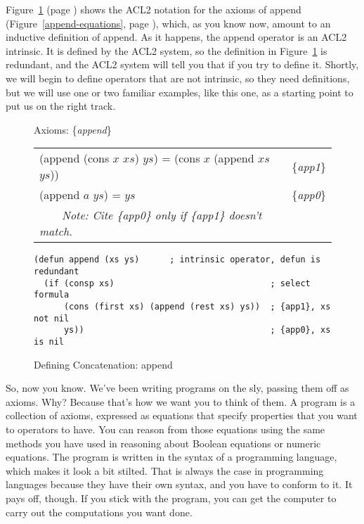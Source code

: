 Figure~\ref{fig:append-defun} (page \pageref{fig:append-defun})
shows the ACL2 notation for the axioms of append
(Figure~\ref{append-equations}, page \pageref{append-equations}),
which, as you know now, amount to an inductive definition of append.
As it happens, the append operator is an ACL2 intrinsic.
It is defined by the ACL2 system, so the definition
in Figure~\ref{fig:append-defun} is redundant,
and the ACL2 system will tell you that if you try to define it.
Shortly, we will begin to define operators that are not
intrinsic, so they need definitions,
but we will use one or two familiar examples, like this one,
as a starting point to put us on the right track.

\begin{figure}
\begin{center}
Axioms: \{\emph{append}\} \\
\begin{tabular}{ll}
(append (cons $x$ $xs$) $ys$) = (cons $x$ (append $xs$ $ys$)) & \{\emph{app1}\} \\
(append $a$ $ys$) =  $ys$                                     & \{\emph{app0}\} \\
~~~~\emph{Note: Cite \{\emph{app0}\} only if \{\emph{app1}\} doesn't match.}&\\
\end{tabular}
\begin{Verbatim}
(defun append (xs ys)      ; intrinsic operator, defun is redundant
  (if (consp xs)                               ; select formula
      (cons (first xs) (append (rest xs) ys))  ; {app1}, xs not nil
      ys))                                     ; {app0}, xs is nil
\end{Verbatim}
\end{center}
\caption{Defining Concatenation: append}
\label{fig:append-defun}
\end{figure}

So, now you know. We've been writing
programs
on the sly, passing them off as axioms.
Why? Because that's how we want you to think of them.
A program is a collection of axioms, expressed as equations
that specify properties that you want to operators to have.
You can reason from those equations using the same methods
you have used in reasoning about Boolean equations or numeric equations.
The program is written in the syntax of a programming language,
which makes it look a bit stilted.
That is always the case in programming languages because
they have their own syntax, and you have to conform to it.
It pays off, though.
If you stick with the program, you can get the computer to carry out
the computations you want done.


